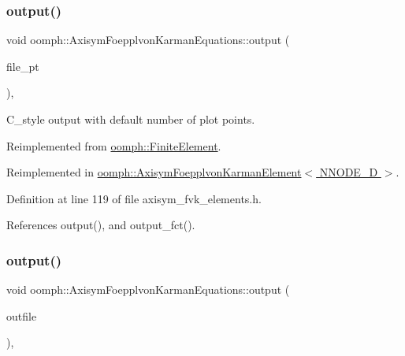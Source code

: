 \mbox{\label{classoomph_1_1AxisymFoepplvonKarmanEquations_a236f169caf08c0214ff686e939b9dd33}} 
\subsubsection{\texorpdfstring{output()}{output()}\hspace{0.1cm}{\footnotesize\ttfamily [3/8]}}
{\footnotesize\ttfamily void oomph\+::\+Axisym\+Foepplvon\+Karman\+Equations\+::output (\begin{DoxyParamCaption}\item[{F\+I\+LE $\ast$}]{file\+\_\+pt }\end{DoxyParamCaption})\hspace{0.3cm}{\ttfamily [inline]}, {\ttfamily [virtual]}}



C\+\_\+style output with default number of plot points. 



Reimplemented from \hyperlink{classoomph_1_1FiniteElement_a72cddd09f8ddbee1a20a1ff404c6943e}{oomph\+::\+Finite\+Element}.



Reimplemented in \hyperlink{classoomph_1_1AxisymFoepplvonKarmanElement_a17a94d66cf74c7be11d8e0a514db1d92}{oomph\+::\+Axisym\+Foepplvon\+Karman\+Element$<$ N\+N\+O\+D\+E\+\_\+D $>$}.



Definition at line 119 of file axisym\+\_\+fvk\+\_\+elements.\+h.



References output(), and output\+\_\+fct().

\mbox{\label{classoomph_1_1AxisymFoepplvonKarmanEquations_a162b507ce3d9126a558790e77ec86e70}} 
\subsubsection{\texorpdfstring{output()}{output()}\hspace{0.1cm}{\footnotesize\ttfamily [4/8]}}
{\footnotesize\ttfamily void oomph\+::\+Axisym\+Foepplvon\+Karman\+Equations\+::output (\begin{DoxyParamCaption}\item[{std\+::ostream \&}]{outfile }\end{DoxyParamCaption})\hspace{0.3cm}{\ttfamily [inline]}, {\ttfamily [virtual]}}



